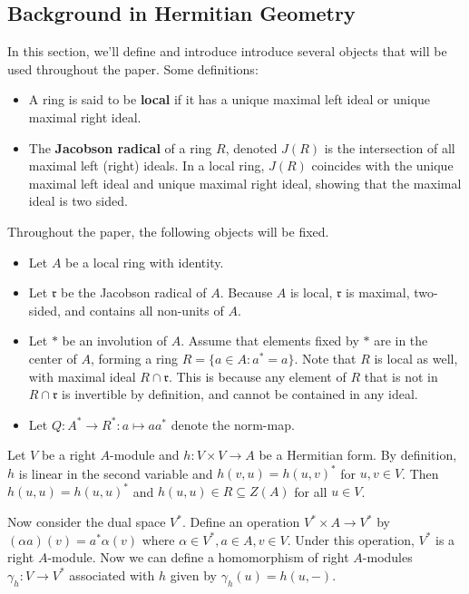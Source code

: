\begin{center}
\section*{Background in Hermitian Geometry}
\end{center}
In this section, we'll define and introduce introduce several objects that will be used throughout the paper.
Some definitions:
\begin{itemize}
\item A ring is said to be \textbf{local} if it has a unique maximal left ideal or unique maximal right ideal.
\item The \textbf{Jacobson radical} of a ring $R$, denoted $J(R)$ is the intersection of all maximal left (right) ideals. In a local ring, $J(R)$ coincides with the unique maximal left ideal and unique maximal right ideal, showing that the maximal ideal is two sided.
\end{itemize}

Throughout the paper, the following objects will be fixed.
\begin{itemize}
\item Let $A$ be a local ring with identity.
\item Let $\mathfrak{r}$ be the Jacobson radical of $A$. Because $A$ is local, $\mathfrak{r}$ is maximal, two-sided, and contains all non-units of $A$.
\item Let $*$ be an involution of $A$. Assume that elements fixed by $*$ are in the center of $A$, forming a ring $R = \{a \in A: a^* = a\}$.
Note that $R$ is local as well, with maximal ideal $R \cap \mathfrak{r}$. This is because any element of $R$ that is not in $R \cap \mathfrak{r}$ is invertible by definition, and cannot be contained in any ideal.
\item Let $Q: A^* \to R^*: a \mapsto aa^*$ denote the norm-map.
\end{itemize}

Let $V$ be a right $A$-module and $h: V \times V \to A$ be a Hermitian form.
By definition, $h$ is linear in the second variable and $h(v, u) = h(u, v)^*$ for $u, v \in V$.
Then $h(u,u) = h(u,u)^*$ and $h(u,u) \in R \subseteq Z(A)$ for all $u \in V$.

Now consider the dual space $V^*$. Define an operation $V^* \times A \to V^*$ by $(\alpha a)(v) = a^* \alpha(v)$ where $\alpha \in V^*, a \in A, v \in V$.
Under this operation, $V^*$ is a right $A$-module.
Now we can define a homomorphism of right $A$-modules $\gamma_h: V \to V^*$ associated with $h$ given by $\gamma_h(u) = h(u, -)$.

